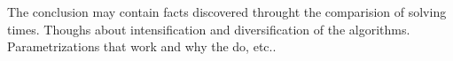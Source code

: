 
The conclusion may contain facts discovered throught the comparision of solving times. Thoughs about intensification and diversification of the algorithms. Parametrizations that work and why the do, etc..


\pagebreak